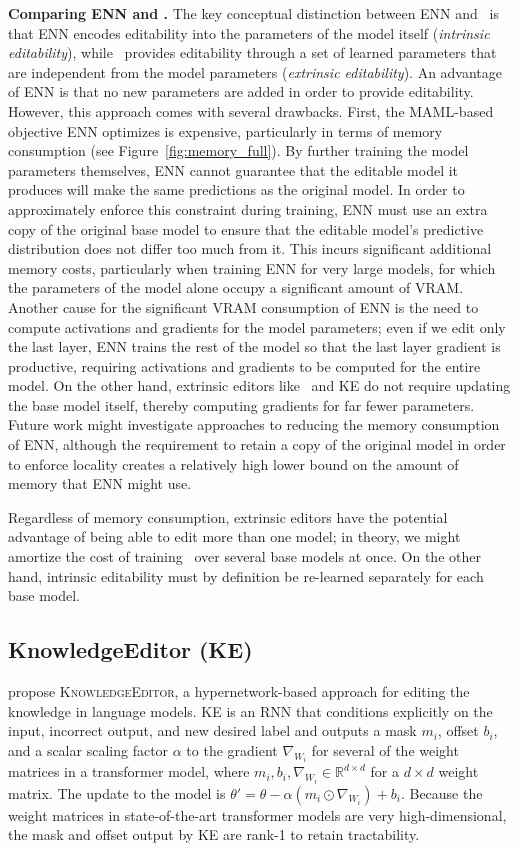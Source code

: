 \textbf{Comparing ENN and \name\@.} The key conceptual distinction between ENN and \name\ is that ENN encodes editability into the parameters of the model itself (\textit{intrinsic editability}), while \name~provides editability through a set of learned parameters that are independent from the model parameters (\textit{extrinsic editability}). An advantage of ENN is that no new parameters are added in order to provide editability. However, this approach comes with several drawbacks. First, the MAML-based objective ENN optimizes is expensive, particularly in terms of memory consumption (see Figure~\ref{fig:memory_full}). By further training the model parameters themselves, ENN cannot guarantee that the editable model it produces will make the same predictions as the original model. In order to approximately enforce this constraint during training, ENN must use an extra copy of the original base model to ensure that the editable model's predictive distribution does not differ too much from it. This incurs significant additional memory costs, particularly when training ENN for very large models, for which the parameters of the model alone occupy a significant amount of VRAM. Another cause for the significant VRAM consumption of ENN is the need to compute activations and gradients for the model parameters; even if we edit only the last layer, ENN trains the rest of the model so that the last layer gradient is productive, requiring activations and gradients to be computed for the entire model. On the other hand, extrinsic editors like \name~and KE do not require updating the base model itself, thereby computing gradients for far fewer parameters. Future work might investigate approaches to reducing the memory consumption of ENN, although the requirement to retain a copy of the original model in order to enforce locality creates a relatively high lower bound on the amount of memory that ENN might use.



Regardless of memory consumption, extrinsic editors have the potential advantage of being able to edit more than one model; in theory, we might amortize the cost of training \name~over several base models at once. On the other hand, intrinsic editability must by definition be re-learned separately for each base model.

\subsection{KnowledgeEditor (KE)}
\cite{Cao2021EditingFK} propose \textsc{KnowledgeEditor}, a hypernetwork-based approach for editing the knowledge in language models. KE is an RNN that conditions explicitly on the input, incorrect output, and new desired label and outputs a mask $m_i$, offset $b_i$, and a scalar scaling factor $\alpha$ to the gradient $\nabla_{W_i}$ for several of the weight matrices in a transformer model, where $m_i,b_i,\nabla_{W_i} \in \mathbb{R}^{d \times d}$ for a $d \times d$ weight matrix. The update to the model is $\theta' = \theta - \alpha (m_i \odot \nabla_{W_i}) + b_i$. Because the weight matrices in state-of-the-art transformer models are very high-dimensional, the mask and offset output by KE are rank-1 to retain tractability.

